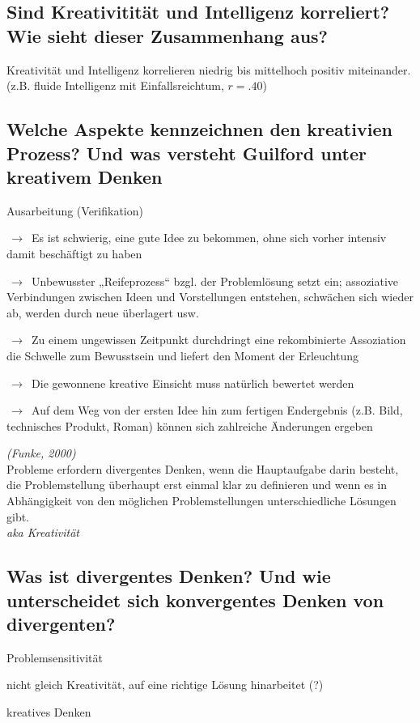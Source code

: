 \documentclass[a6paper,10pt,DIV=40]{scrartcl}
\begin{document}
\subsection{Sind Kreativitität und Intelligenz korreliert? Wie sieht dieser Zusammenhang aus?}
    Kreativität und Intelligenz korrelieren niedrig bis mittelhoch positiv miteinander.\\
    (z.B. fluide Intelligenz mit Einfallsreichtum, $r = .40$)
\subsection{Welche Aspekte kennzeichnen den kreativien Prozess? Und was versteht Guilford unter kreativem Denken}
    \begin{labeling}{Ausarbeitung (Verifikation)}
        \item [Vorbereitung] $\,\to\,$ Es ist schwierig, eine gute Idee zu bekommen, ohne sich vorher intensiv damit beschäftigt zu haben
        \item [Inkubation] $\,\to\,$ Unbewusster „Reifeprozess“ bzgl. der Problemlösung setzt ein; assoziative Verbindungen zwischen Ideen und Vorstellungen entstehen, schwächen sich wieder ab, werden durch neue überlagert usw.
        \item [Einsicht (Inspiration)] $\,\to\,$ Zu einem ungewissen Zeitpunkt durchdringt eine rekombinierte Assoziation die Schwelle zum Bewusstsein und liefert den Moment der Erleuchtung
        \item [Bewertung] $\,\to\,$ Die gewonnene kreative Einsicht muss natürlich bewertet werden
        \item [Ausarbeitung (Verifikation)] $\,\to\,$ Auf dem Weg von der ersten Idee hin zum fertigen Endergebnis (z.B. Bild, technisches Produkt, Roman) können sich zahlreiche Änderungen ergeben
    \end{labeling}
    \textit{(Funke, 2000)}\\
    Probleme erfordern divergentes Denken, wenn die Hauptaufgabe darin besteht, die Problemstellung überhaupt erst einmal klar zu definieren und wenn es in Abhängigkeit von den möglichen Problemstellungen unterschiedliche Lösungen gibt.\\
    \textit{aka Kreativität}

\subsection{Was ist divergentes Denken? Und wie unterscheidet sich konvergentes Denken von divergenten? }
    \begin{labeling}{Problemsensitivität}
        \item [konvergentes Denken] nicht gleich Kreativität, auf eine richtige Lösung hinarbeitet (?)
        \item [divergentes Denken] kreatives Denken
    \end{labeling}
\end{document}
